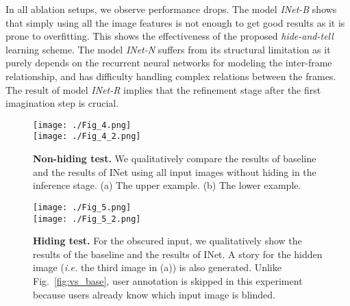 \documentclass[letterpaper]{article} \usepackage{aaai20}  \usepackage{times}  \usepackage{helvet} \usepackage{courier}  \usepackage[hyphens]{url}  \usepackage{graphicx} \urlstyle{rm} \def\UrlFont{\rm}  \usepackage{graphicx}  \frenchspacing  \setlength{\pdfpagewidth}{8.5in}  \setlength{\pdfpageheight}{11in}
\newcommand{\figref}[1]{Fig.~\ref{#1}}
\newcommand{\ie}{{\it i.e. }}
\begin{document}
In all ablation setups, we observe performance drops. 
The model \textit{INet-B} shows that simply using all the image features is not enough to get good results as it is prone to overfitting. This shows the effectiveness of the proposed \textit{hide-and-tell} learning scheme. The model \textit{INet-N} suffers from its structural limitation as it purely depends on the recurrent neural networks for modeling the inter-frame relationship, and has difficulty handling complex relations between the frames. The result of model \textit{INet-R} implies that the refinement stage after the first imagination step is crucial.

\begin{table}
\centering
{}
\caption{\textbf{Comparison to Existing Methods.} Following automatic metrics are used: BLEU (B), METEOR (M), ROUGE-L (R), and CIDEr (C). 
The result shows that our approach achieves new state-of-the-art result. }
\label{tab:sota}
\end{table}

\begin{figure*}
\centering
\texttt{[image: ./Fig\_4.png]} \\
\texttt{[image: ./Fig\_4\_2.png]} 
\caption{\textbf{Non-hiding test.} We qualitatively compare the results of baseline and the results of INet using all input images without hiding in the inference stage. (a) The upper example. (b) The lower example.  }
\label{fig:vs_base}
\centering
\texttt{[image: ./Fig\_5.png]} \\
\texttt{[image: ./Fig\_5\_2.png]} 
\caption{\textbf{Hiding test.} For the obscured input, we qualitatively show the results of the baseline and the results of INet. A story for the hidden image (\ie the third image in (a)) is also generated.
Unlike \figref{fig:vs_base}, user annotation is skipped in this experiment because users already know which input image is blinded. }
\label{fig:blind}
\end{figure*}
\end{document}
